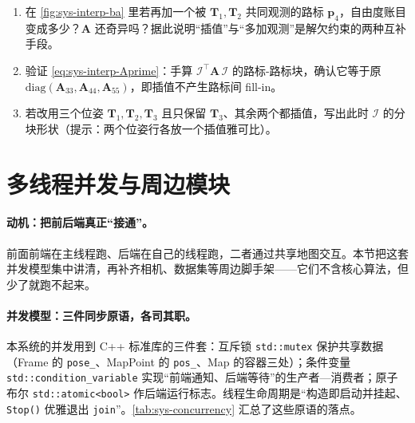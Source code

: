 \begin{practice}[练习]
\begin{enumerate}
  \item 在 \cref{fig:sys-interp-ba} 里若再加一个被 $\mathbf{T}_1,\mathbf{T}_2$ 共同观测的路标 $\mathbf{p}_4$，自由度账目变成多少？$\mathbf{A}$ 还奇异吗？据此说明“插值”与“多加观测”是解欠约束的两种互补手段。
  \item 验证 \cref{eq:sys-interp-Aprime}：手算 $\boldsymbol{\mathcal{I}}^\top\mathbf{A}\,\boldsymbol{\mathcal{I}}$ 的路标-路标块，确认它等于原 $\mathrm{diag}(\mathbf{A}_{33},\mathbf{A}_{44},\mathbf{A}_{55})$，即插值不产生路标间 fill-in。
  \item 若改用三个位姿 $\mathbf{T}_1,\mathbf{T}_2,\mathbf{T}_3$ 且只保留 $\mathbf{T}_3$、其余两个都插值，写出此时 $\boldsymbol{\mathcal{I}}$ 的分块形状（提示：两个位姿行各放一个插值雅可比）。
\end{enumerate}
\end{practice}

\section{多线程并发与周边模块}
\label{sec:sys-thread}

\paragraph{动机：把前后端真正“接通”。}
前面前端在主线程跑、后端在自己的线程跑，二者通过共享地图交互。本节把这套并发模型集中讲清，再补齐相机、数据集等周边脚手架——它们不含核心算法，但少了就跑不起来。

\paragraph{并发模型：三件同步原语，各司其职。}
本系统的并发用到 C++ 标准库的三件套：互斥锁 \texttt{std::mutex} 保护共享数据（Frame 的 \texttt{pose\_}、MapPoint 的 \texttt{pos\_}、Map 的容器三处）；条件变量 \texttt{std::condition\_variable} 实现“前端通知、后端等待”的生产者—消费者；原子布尔 \texttt{std::atomic<bool>} 作后端运行标志。线程生命周期是“构造即启动并挂起、\texttt{Stop()} 优雅退出 \texttt{join}”。\cref{tab:sys-concurrency} 汇总了这些原语的落点。

